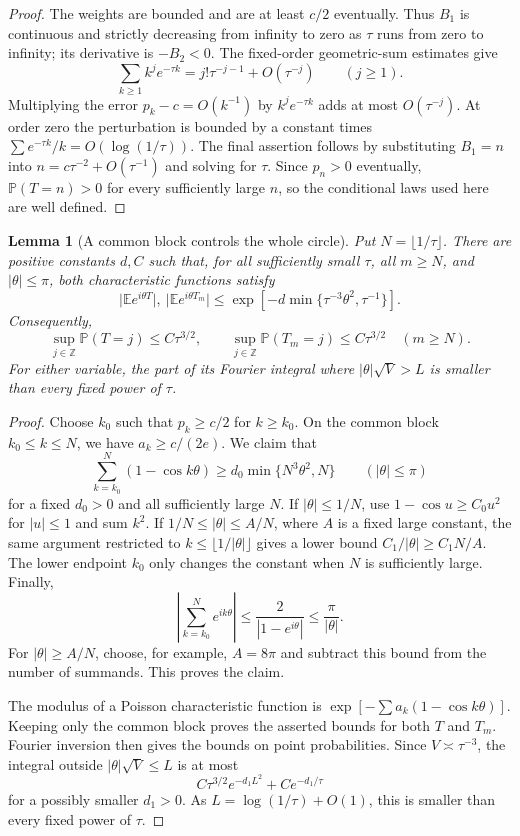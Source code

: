 \documentclass[11pt,letterpaper]{article}
\numberwithin{equation}{section}
\newtheorem{lemma}[theorem]{Lemma}
\theoremstyle{remark}\newtheorem{remark}[theorem]{Remark}
\theoremstyle{definition}\newtheorem{definition}[theorem]{Definition}\theoremstyle{plain}
\newcommand{\E}{\mathbb E}
\newcommand{\Pbb}{\mathbb P}
\newcommand{\Z}{\mathbb Z}
\begin{document}
\begin{proof}
The weights are bounded and are at least $c/2$ eventually.  Thus $B_1$ is
continuous and strictly decreasing from infinity to zero as $\tau$ runs
from zero to infinity; its derivative is $-B_2<0$.  The fixed-order
geometric-sum estimates give
\[
 \sum_{k\geq1}k^je^{-\tau k}
 =j!\tau^{-j-1}+O(\tau^{-j})\qquad(j\geq1).
\]
Multiplying the error $p_k-c=O(k^{-1})$ by $k^je^{-\tau k}$ adds at most
$O(\tau^{-j})$.  At order zero the perturbation is bounded by a constant
times $\sum e^{-\tau k}/k=O(\log(1/\tau))$.  The final assertion follows
by substituting $B_1=n$ into $n=c\tau^{-2}+O(\tau^{-1})$ and solving for
$\tau$.  Since $p_n>0$ eventually, $\Pbb(T=n)>0$ for every sufficiently
large $n$, so the conditional laws used here are well defined.
\end{proof}

\begin{lemma}[A common block controls the whole circle]
\label{ncy:gb:lem:fourierblock}
Put $N=\lfloor1/\tau\rfloor$.  There are positive constants $d,C$ such
that, for all sufficiently small $\tau$, all $m\geq N$, and
$|\theta|\leq\pi$, both characteristic functions satisfy
\[
 \bigl|\E e^{i\theta T}\bigr|,
 \ \bigl|\E e^{i\theta T_m}\bigr|
 \leq
 \exp\!\left[-d\min\{\tau^{-3}\theta^2,\tau^{-1}\}\right].
\]
Consequently,
\[
 \sup_{j\in\Z}\Pbb(T=j)\leq C\tau^{3/2},\qquad
 \sup_{j\in\Z}\Pbb(T_m=j)\leq C\tau^{3/2}\quad(m\geq N).
\]
For either variable, the part of its Fourier integral where
$|\theta|\sqrt V>L$ is smaller than every fixed power of $\tau$.
\end{lemma}

\begin{proof}
Choose $k_0$ such that $p_k\geq c/2$ for $k\geq k_0$.  On the common
block $k_0\leq k\leq N$, we have $a_k\geq c/(2e)$.  We claim that
\[
 \sum_{k=k_0}^N(1-\cos k\theta)
 \geq d_0\min\{N^3\theta^2,N\}
 \qquad(|\theta|\leq\pi)
\]
for a fixed $d_0>0$ and all sufficiently large $N$.  If
$|\theta|\leq1/N$, use $1-\cos u\geq C_0u^2$ for $|u|\leq1$ and sum
$k^2$.  If $1/N\leq|\theta|\leq A/N$, where $A$ is a fixed large
constant, the same argument restricted to
$k\leq\lfloor1/|\theta|\rfloor$ gives a lower bound
$C_1/|\theta|\geq C_1N/A$.  The lower endpoint $k_0$ only changes the
constant when $N$ is sufficiently large.  Finally,
\[
 \left|\sum_{k=k_0}^N e^{ik\theta}\right|
 \leq\frac{2}{|1-e^{i\theta}|}
 \leq\frac{\pi}{|\theta|}.
\]
For $|\theta|\geq A/N$, choose, for example, $A=8\pi$ and subtract
this bound from the number of summands.  This proves the claim.

The modulus of a Poisson characteristic function is
$\exp[-\sum a_k(1-\cos k\theta)]$.  Keeping only the common block proves
the asserted bounds for both $T$ and $T_m$.  Fourier inversion then gives
the bounds on point probabilities.  Since $V\asymp\tau^{-3}$, the
integral outside $|\theta|\sqrt V\leq L$ is at most
\[
 C\tau^{3/2}e^{-d_1L^2}+C e^{-d_1/\tau}
\]
for a possibly smaller $d_1>0$.  As $L=\log(1/\tau)+O(1)$, this is
smaller than every fixed power of $\tau$.
\end{proof}
\end{document}
